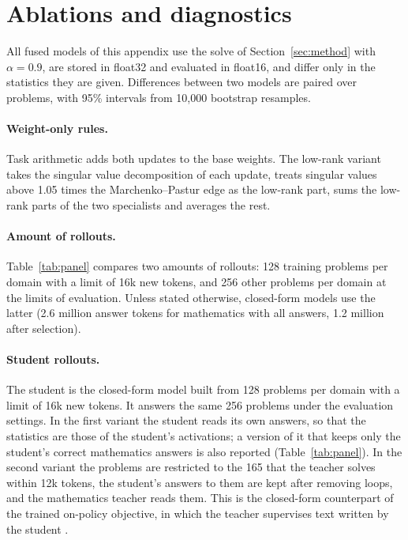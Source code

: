 \FloatBarrier
\section{Ablations and diagnostics}
\label{app:ablations}

All fused models of this appendix use the solve of
Section~\ref{sec:method} with $\alpha=0.9$, are stored in float32 and
evaluated in float16, and differ only in the statistics they are given.
Differences between two models are paired over problems, with 95\% intervals
from 10{,}000 bootstrap resamples.

\paragraph{Weight-only rules.} Task arithmetic adds both updates to the base
weights. The low-rank variant takes the singular value decomposition of each
update, treats singular values above 1.05 times the Marchenko--Pastur edge as
the low-rank part, sums the low-rank parts of the two specialists and
averages the rest.

\paragraph{Amount of rollouts.} Table~\ref{tab:panel} compares two amounts of
rollouts: 128 training problems per domain with a limit of 16k new tokens,
and 256 other problems per domain at the limits of evaluation. Unless stated
otherwise, closed-form models use the latter (2.6 million answer tokens for
mathematics with all answers, 1.2 million after selection).

\paragraph{Student rollouts.} The student is the closed-form model built from
128 problems per domain with a limit of 16k new tokens. It answers the same
256 problems under the evaluation settings. In the first variant the student
reads its own answers, so that the statistics are those of the student's
activations; a version of it that keeps only the student's correct
mathematics answers is also reported (Table~\ref{tab:panel}). In the second
variant the problems are restricted to the 165 that the teacher solves within
12k tokens, the student's answers to them are kept after removing loops, and
the mathematics teacher reads them. This is the closed-form counterpart of the
trained on-policy objective, in which the teacher supervises text written by
the student \citep{hou2026whatmatters,xu2026paced,hou2026uniopd}.

